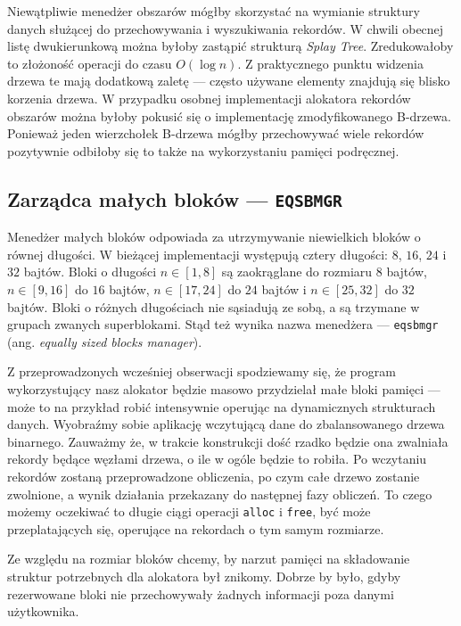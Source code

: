 \documentclass[12pt,a4paper,titlepage,twoside]{mwart}
\begin{document}
Niewątpliwie menedżer obszarów mógłby skorzystać na wymianie struktury danych
służącej do przechowywania i wyszukiwania rekordów. W chwili obecnej listę
dwukierunkową można byłoby zastąpić strukturą \textit{Splay Tree}.
Zredukowałoby to złożoność operacji do czasu $O(\log n)$. Z praktycznego punktu
widzenia drzewa te mają dodatkową zaletę --- często używane elementy znajdują
się blisko korzenia drzewa. W przypadku osobnej implementacji alokatora
rekordów obszarów można byłoby pokusić się o implementację zmodyfikowanego
B-drzewa. Ponieważ jeden wierzchołek B-drzewa mógłby przechowywać wiele
rekordów pozytywnie odbiłoby się to także na wykorzystaniu pamięci podręcznej.

\newpage

\subsection{Zarządca małych bloków --- \texttt{EQSBMGR}}

Menedżer małych bloków odpowiada za utrzymywanie niewielkich bloków o równej
długości. W bieżącej implementacji występują cztery długości: $8$, $16$, $24$ i
$32$ bajtów. Bloki o długości $n \in [1,8]$ są zaokrąglane do rozmiaru $8$
bajtów, $n \in [9,16]$ do $16$ bajtów, $n \in [17,24]$ do $24$ bajtów i $n \in
[25,32]$ do $32$ bajtów. Bloki o różnych długościach nie sąsiadują ze sobą, a
są trzymane w grupach zwanych superblokami. Stąd też wynika nazwa menedżera ---
\texttt{eqsbmgr} (ang. \textit{equally sized blocks manager}).

Z przeprowadzonych wcześniej obserwacji spodziewamy się, że program
wykorzystujący nasz alokator będzie masowo przydzielał małe bloki pamięci ---
może to na przykład robić intensywnie operując na dynamicznych strukturach danych.
Wyobraźmy sobie aplikację wczytującą dane do zbalansowanego drzewa binarnego.
Zauważmy że, w trakcie konstrukcji dość rzadko będzie ona zwalniała rekordy
będące węzłami drzewa, o ile w ogóle będzie to robiła. Po wczytaniu rekordów
zostaną przeprowadzone obliczenia, po czym całe drzewo zostanie zwolnione, a
wynik działania przekazany do następnej fazy obliczeń. To czego możemy
oczekiwać to długie ciągi operacji \texttt{alloc} i \texttt{free}, być może
przeplatających się, operujące na rekordach o tym samym rozmiarze.

Ze względu na rozmiar bloków chcemy, by narzut pamięci na składowanie struktur
potrzebnych dla alokatora był znikomy. Dobrze by było, gdyby rezerwowane bloki
nie przechowywały żadnych informacji poza danymi użytkownika.
\end{document}
